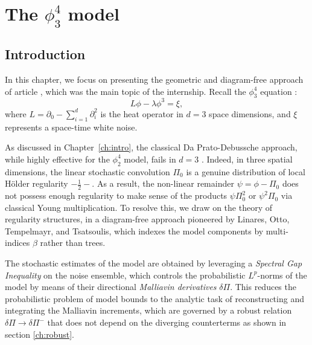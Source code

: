 \chapter{The $\phi^4_3$ model}

\section{Introduction}

In this chapter, we focus on presenting the geometric and diagram-free approach of article \cite{BOT25}, which was the main topic of the internship.
Recall the $\phi^4_3$ equation :
\begin{equation}
    L\phi - \lambda \phi^3 = \xi,
\end{equation}
where $L = \partial_0 - \sum_{i=1}^d \partial_i^2$ is the heat operator in $d = 3$ space dimensions, and $\xi$ represents a space-time white noise. 

As discussed in Chapter~\ref{ch:intro}, the classical Da Prato-Debussche approach, while highly effective for the $\phi^4_2$ model, fails in $d = 3$ \cite{Ber22}. Indeed, in three spatial dimensions, the linear stochastic convolution $\Pi_0$ is a genuine distribution of local Hölder regularity $-\frac{1}{2}-$. As a result, the non-linear remainder $\psi = \phi - \Pi_0$ does not possess enough regularity to make sense of the products $\psi \Pi_0^2$ or $\psi^2 \Pi_0$ via classical Young multiplication. To resolve this, we draw on the theory of regularity structures, in a diagram-free approach pioneered by Linares, Otto, Tempelmayr, and Tsatsoulis, which indexes the model components by multi-indices $\beta$ rather than trees.

The stochastic estimates of the model are obtained by leveraging a \textit{Spectral Gap Inequality} on the noise ensemble, which controls the probabilistic $L^p$-norms of the model by means of their directional \textit{Malliavin derivatives} $\delta \Pi$. This reduces the probabilistic problem of model bounds to the analytic task of reconstructing and integrating the Malliavin increments, which are governed by a robust relation $\delta \Pi \to \delta \Pi^-$ that does not depend on the diverging counterterms as shown in section \ref{ch:robust}.



